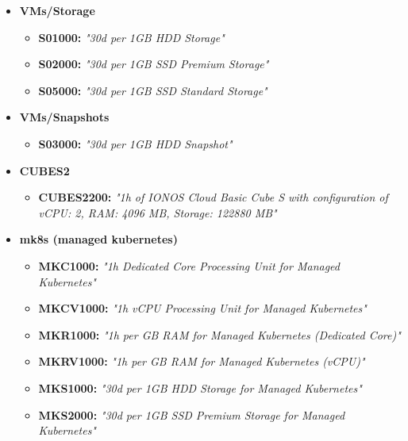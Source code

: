 \begin{itemize}
\begin{itemize}
\begin{itemize}
                    \end{itemize}
              \item \textbf{VMs/Storage } \begin{itemize}
                        \item \textbf{  S01000: } \textit{"30d per 1GB HDD Storage"}
                        \item \textbf{  S02000: } \textit{"30d per 1GB SSD Premium Storage"}
                        \item \textbf{  S05000: } \textit{"30d per 1GB SSD Standard Storage"}
                    \end{itemize}
              \item \textbf{VMs/Snapshots } \begin{itemize}
                        \item \textbf{  S03000: } \textit{"30d per 1GB HDD Snapshot"}
                    \end{itemize}
              \item \textbf{CUBES2 } \begin{itemize}
                        \item \textbf{  CUBES2200: } \textit{"1h of IONOS Cloud Basic Cube S with configuration of vCPU: 2, RAM: 4096 MB, Storage: 122880 MB"}
                    \end{itemize}
              \item \textbf{mk8s (managed kubernetes) } \begin{itemize}
                        \item \textbf{  MKC1000: } \textit{"1h Dedicated Core Processing Unit for Managed Kubernetes"}
                        \item \textbf{  MKCV1000: } \textit{"1h vCPU Processing Unit for Managed Kubernetes"}
                        \item \textbf{  MKR1000: } \textit{"1h per GB RAM for Managed Kubernetes (Dedicated Core)"}
                        \item \textbf{  MKRV1000: } \textit{"1h per GB RAM for Managed Kubernetes (vCPU)"}
                        \item \textbf{  MKS1000: } \textit{"30d per 1GB HDD Storage for Managed Kubernetes"}
                        \item \textbf{  MKS2000: } \textit{"30d per 1GB SSD Premium Storage for Managed Kubernetes"}
                    \end{itemize}
          \end{itemize}

\end{itemize}
